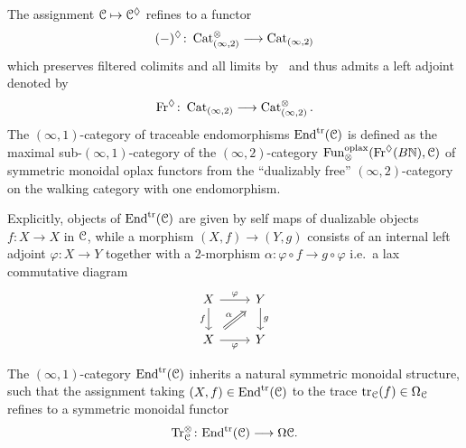 \begin{cons}
The assignment $\mathcal{C}\mapsto \mathcal{C}^{\lozenge}$ refines to a functor
\[ (-)^{\lozenge}\colon \operatorname{Cat}^{\otimes}_{(\infty,2)} \longrightarrow \operatorname{Cat}_{(\infty,2)}\]
which preserves filtered colimits and all limits by~\cite[Proposition 4.6.1.11]{Lurie2017}
and thus admits a left adjoint denoted by
\[ \mathrm{Fr}^{\lozenge}\colon \operatorname{Cat}_{(\infty,2)} \longrightarrow \operatorname{Cat}^{\otimes}_{(\infty,2)}.\]
The $(\infty,1)$-category of traceable endomorphisms $\mathrm{End}^{\mathrm{tr}}(\mathcal{C})$ is defined as the maximal sub-$(\infty,1)$-category of the $(\infty,2)$-category $\operatorname{Fun}^{\mathrm{oplax}}_{\otimes}(\mathrm{Fr}^{\lozenge}(B\mathbb{N}), \mathcal{C})$
of symmetric monoidal oplax functors from the ``dualizably free'' $(\infty,2)$-category
on the walking category with one endomorphism.
\end{cons}

Explicitly, objects of $\mathrm{End}^{\mathrm{tr}}(\mathcal{C})$ are given by self
maps of dualizable objects $f\colon X \to X$ in $\mathcal{C}$, while a morphism $(X,f) \to (Y,g)$
consists of an internal left adjoint $\varphi\colon X \to Y$ together with a 2-morphism
$\alpha \colon \varphi \circ f \to g \circ \varphi $ i.e.~a lax commutative diagram
\[\begin{tikzcd}
    X & Y \\
    X & Y \arrow["\varphi", from=1-1, to=1-2] \arrow["f"', from=1-1, to=2-1] \arrow["g", from=1-2, to=2-2] \arrow["\alpha", shorten <=4pt, shorten >=4pt, Rightarrow, from=2-1, to=1-2] \arrow["\varphi"', from=2-1, to=2-2]
  \end{tikzcd}\]

\begin{thm}\cite[Theorem 1.7.]{Hoyois_Scherotzke_Sibilla2017}\label{thm: trace functor}
  The $(\infty,1)$-category $\mathrm{End}^{\mathrm{tr}}(\mathcal{C})$ inherits a natural
  symmetric monoidal structure, such that the assignment taking $(X,f) \in \mathrm{End}^{\mathrm{tr}}(\mathcal{C})$ to the
  trace $\mathrm{tr}_{\mathcal{C}} (f) \in \Omega_{\mathcal{C}}$ refines to a symmetric monoidal functor
  \[ \mathrm{Tr}^{\otimes}_{\mathcal{C}}\colon \mathrm{End}^{\mathrm{tr}}(\mathcal{C}) \longrightarrow \Omega \mathcal{C}.\]
\end{thm}

